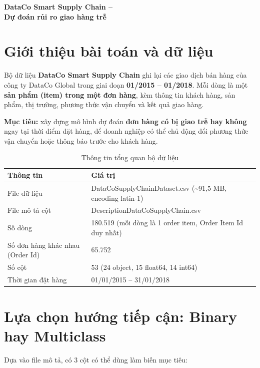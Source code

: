 \documentclass[11pt,a4paper]{article}
\newcommand{\col}[1]{\textsf{#1}}
\begin{document}
\hypersetup{pageanchor=false}
\begin{titlepage}
\centering
\vspace*{\fill}
{\Huge\bfseries DataCo Smart Supply Chain --\\[0.4cm] Dự đoán rủi ro giao hàng trễ\par}
\vspace*{\fill}
\end{titlepage}
\hypersetup{pageanchor=true}

\tableofcontents
\newpage

\section{Giới thiệu bài toán và dữ liệu}
Bộ dữ liệu \textbf{DataCo Smart Supply Chain} ghi lại các giao dịch bán hàng của công ty DataCo Global trong giai đoạn
\textbf{01/2015 -- 01/2018}. Mỗi dòng là một \textbf{sản phẩm (item) trong một đơn hàng}, kèm thông tin khách hàng,
sản phẩm, thị trường, phương thức vận chuyển và kết quả giao hàng.

\textbf{Mục tiêu:} xây dựng mô hình dự đoán \textbf{đơn hàng có bị giao trễ hay không} ngay tại thời điểm đặt hàng,
để doanh nghiệp có thể chủ động đổi phương thức vận chuyển hoặc thông báo trước cho khách hàng.

\begin{table}[H]\centering
\caption{Thông tin tổng quan bộ dữ liệu}
\begin{tabularx}{\linewidth}{@{}lX@{}}
\toprule
\textbf{Thông tin} & \textbf{Giá trị} \\ \midrule
File dữ liệu & \col{DataCoSupplyChainDataset.csv} (\textasciitilde 91,5 MB, encoding latin-1) \\
File mô tả cột & \col{DescriptionDataCoSupplyChain.csv} \\
Số dòng & 180.519 (mỗi dòng là 1 order item, \col{Order Item Id} duy nhất) \\
Số đơn hàng khác nhau (\col{Order Id}) & 65.752 \\
Số cột & 53 (24 object, 15 float64, 14 int64) \\
Thời gian đặt hàng & 01/01/2015 -- 31/01/2018 \\
\bottomrule
\end{tabularx}
\end{table}

\section{Lựa chọn hướng tiếp cận: Binary hay Multiclass}
Dựa vào file mô tả, có 3 cột có thể dùng làm biến mục tiêu:
\end{document}

